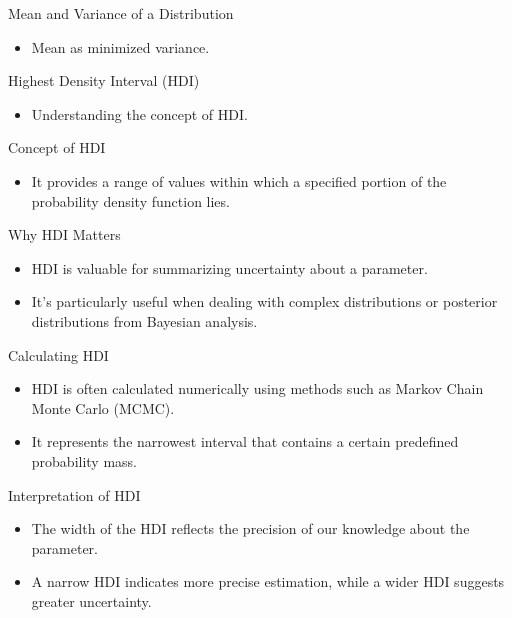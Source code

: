 \documentclass{beamer}
\begin{document}
\begin{frame}{Mean and Variance of a Distribution}
  \begin{itemize}
    \item Mean as minimized variance.
  \end{itemize}
\end{frame}

\begin{frame}{Highest Density Interval (HDI)}
  \begin{itemize}
    \item Understanding the concept of HDI.
  \end{itemize}
\end{frame}

\begin{frame}{Concept of HDI}
  \begin{itemize}
    \item It provides a range of values within which a specified portion of the probability density function lies.
  \end{itemize}
\end{frame}

\begin{frame}{Why HDI Matters}
  \begin{itemize}
    \item HDI is valuable for summarizing uncertainty about a parameter.
    \item It's particularly useful when dealing with complex distributions or posterior distributions from Bayesian analysis.
  \end{itemize}
\end{frame}

\begin{frame}{Calculating HDI}
  \begin{itemize}
    \item HDI is often calculated numerically using methods such as Markov Chain Monte Carlo (MCMC).
    \item It represents the narrowest interval that contains a certain predefined probability mass.
  \end{itemize}
\end{frame}

\begin{frame}{Interpretation of HDI}
  \begin{itemize}
    \item The width of the HDI reflects the precision of our knowledge about the parameter.
    \item A narrow HDI indicates more precise estimation, while a wider HDI suggests greater uncertainty.
  \end{itemize}
\end{frame}
\end{document}
